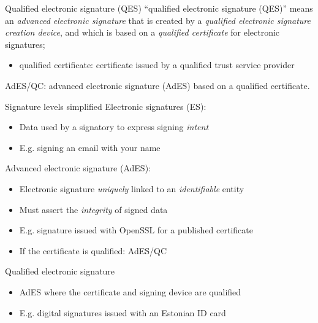 \begin{frame}{Qualified electronic signature (QES)}
  \enquote{qualified electronic signature (QES)} means an \emph{advanced electronic signature} that is created by a \emph{qualified electronic signature creation device}, and which is based on a \emph{qualified certificate} for electronic signatures;
  \begin{itemize}[<+(1)->]
    \item qualified certificate: certificate issued by a qualified trust service provider
  \end{itemize}

  \vfill

  \pause
  AdES/QC: advanced electronic signature (AdES) based on a qualified certificate.
\end{frame}

\begin{frame}{Signature levels simplified}
  \pause
  Electronic signatures (ES):
  \begin{itemize}[<+(1)->]
    \item Data used by a signatory to express signing \emph{intent}
    \item E.g. signing an email with your name
  \end{itemize}

  \pause
  Advanced electronic signature (AdES):
  \begin{itemize}[<+(1)->]
    \item Electronic signature \emph{uniquely} linked to an \emph{identifiable} entity
    \item Must assert the \emph{integrity} of signed data
    \item E.g. signature issued with OpenSSL for a published certificate
    \item If the certificate is qualified: AdES/QC
  \end{itemize}

  \pause
  Qualified electronic signature
  \begin{itemize}[<+(1)->]
    \item AdES where the certificate and signing device are qualified
    \item E.g. digital signatures issued with an Estonian ID card
  \end{itemize}
\end{frame}

